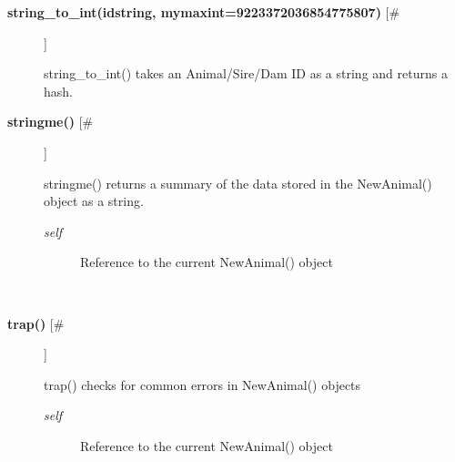 \begin{description}
\item[\textbf{string\_to\_int(idstring, mymaxint=9223372036854775807)} [\#]
]
\par string\_to\_int() takes an Animal/Sire/Dam ID as a string and returns a
hash.

\item[\textbf{stringme()} [\#]
]
\par stringme() returns a summary of the data stored in the NewAnimal() object
as a string.
\begin{description}
\item[\textit{self}
]
Reference to the current NewAnimal() object
\end{description}\\

\item[\textbf{trap()} [\#]
]
\par trap() checks for common errors in NewAnimal() objects
\begin{description}
\item[\textit{self}
]
Reference to the current NewAnimal() object
\end{description}\\

\end{description}
